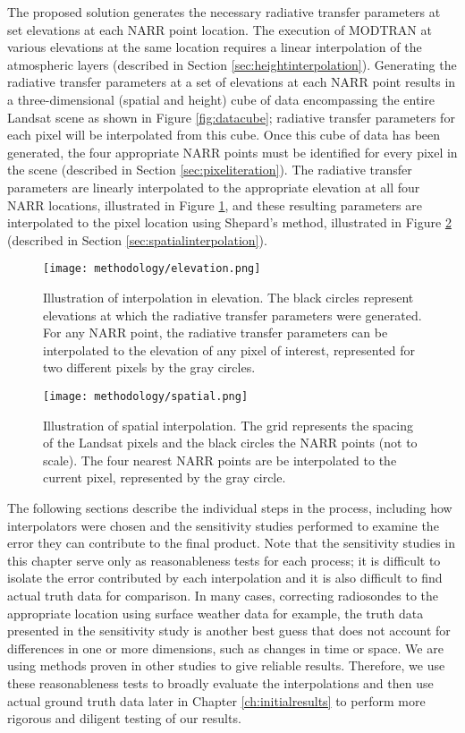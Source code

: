\documentclass{book}
\begin{document}
The proposed solution generates the necessary radiative transfer parameters at set elevations at each NARR point location.  The execution of MODTRAN at various elevations at the same location requires a linear interpolation of the atmospheric layers (described in Section \ref{sec:heightinterpolation}).  Generating the radiative transfer parameters at a set of elevations at each NARR point results in a three-dimensional (spatial and height) cube of data encompassing the entire Landsat scene as shown in Figure \ref{fig:datacube}; radiative transfer parameters for each pixel will be interpolated from this cube.  Once this cube of data has been generated, the four appropriate NARR points must be identified for every pixel in the scene (described in Section \ref{sec:pixeliteration}).  The radiative transfer parameters are linearly interpolated to the appropriate elevation at all four NARR locations, illustrated in Figure \ref{fig:elevation}, and these resulting parameters are interpolated to the pixel location using Shepard's method, illustrated in Figure \ref{fig:spatial} (described in Section \ref{sec:spatialinterpolation}).

\begin{figure}[H]
\centering
\texttt{[image: methodology/elevation.png]}
\caption{Illustration of interpolation in elevation.  The black circles represent elevations at which the radiative transfer parameters were generated.  For any NARR point, the radiative transfer parameters can be interpolated to the elevation of any pixel of interest, represented for two different pixels by the gray circles.}
\label{fig:elevation}
\end{figure}

\begin{figure}[H]
\centering
\texttt{[image: methodology/spatial.png]}
\caption{Illustration of spatial interpolation.  The grid represents the spacing of the Landsat pixels and the black circles the NARR points (not to scale).  The four nearest NARR points are be interpolated to the current pixel, represented by the gray circle.}
\label{fig:spatial}
\end{figure}

The following sections describe the individual steps in the process, including how interpolators were chosen and the sensitivity studies performed to examine the error they can contribute to the final product.  Note that the sensitivity studies in this chapter serve only as reasonableness tests for each process; it is difficult to isolate the error contributed by each interpolation and it is also difficult to find actual truth data for comparison.  In many cases, correcting radiosondes to the appropriate location using surface weather data for example, the truth data presented in the sensitivity study is another best guess that does not account for differences in one or more dimensions, such as changes in time or space.  We are using methods proven in other studies to give reliable results.  Therefore, we use these reasonableness tests to broadly evaluate the interpolations and then use actual ground truth data later in Chapter \ref{ch:initialresults} to perform more rigorous and diligent testing of our results.
\end{document}
